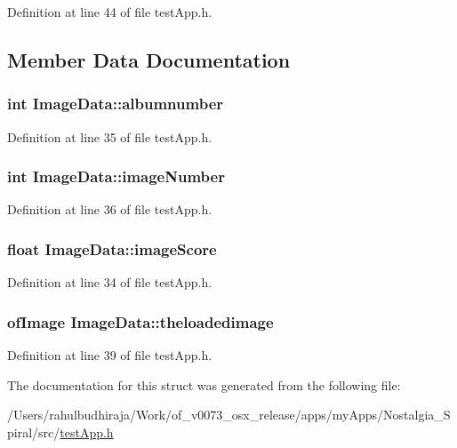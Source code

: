Definition at line 44 of file test\-App.\-h.



\subsection{Member Data Documentation}
\hypertarget{struct_image_data_a372655668350953b85fda1f07cd3ffe1}{
\subsubsection[{albumnumber}]{\setlength{\rightskip}{0pt plus 5cm}int Image\-Data\-::albumnumber}}\label{struct_image_data_a372655668350953b85fda1f07cd3ffe1}


Definition at line 35 of file test\-App.\-h.

\hypertarget{struct_image_data_a254eb9353be246c69591d51088683397}{
\subsubsection[{image\-Number}]{\setlength{\rightskip}{0pt plus 5cm}int Image\-Data\-::image\-Number}}\label{struct_image_data_a254eb9353be246c69591d51088683397}


Definition at line 36 of file test\-App.\-h.

\hypertarget{struct_image_data_a7161728d2f1bd4240bd9359f6276dd3b}{
\subsubsection[{image\-Score}]{\setlength{\rightskip}{0pt plus 5cm}float Image\-Data\-::image\-Score}}\label{struct_image_data_a7161728d2f1bd4240bd9359f6276dd3b}


Definition at line 34 of file test\-App.\-h.

\hypertarget{struct_image_data_acf1bde00dd79a0960269618d9b885f61}{
\subsubsection[{theloadedimage}]{\setlength{\rightskip}{0pt plus 5cm}of\-Image Image\-Data\-::theloadedimage}}\label{struct_image_data_acf1bde00dd79a0960269618d9b885f61}


Definition at line 39 of file test\-App.\-h.



The documentation for this struct was generated from the following file\-:\begin{DoxyCompactItemize}
\item 
/\-Users/rahulbudhiraja/\-Work/of\-\_\-v0073\-\_\-osx\-\_\-release/apps/my\-Apps/\-Nostalgia\-\_\-\-Spiral/src/\hyperlink{test_app_8h}{test\-App.\-h}\end{DoxyCompactItemize}
